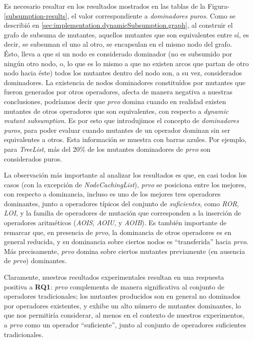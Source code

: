 Es necesario resaltar en los resultados mostrados en las tablas de la Figura-\ref{subsumption-results}, el valor correspondiente a \emph{dominadores puros}. Como se describi\'o en \ref{sec:implementation.dynamicSubsumption.graph}, al construir el grafo de subsuma de mutantes, aquellos mutantes que son equivalentes entre s\'i, es decir, se subsuman el uno al otro, se encapsulan en el mismo nodo del grafo. \'Esto, lleva a que si un nodo es considerado dominador (no es subsumido por ning\'un otro nodo, o, lo que es lo mismo a que no existen arcos que partan de otro nodo hacia \'este) todos los mutantes dentro del nodo son, a su vez, considerados dominadores. La existencia de nodos dominadores constitu\'idos por mutantes que fueron generados por otros operadores, afecta de manera negativa a nuestras conclusiones, podr\'iamos decir que \emph{prvo} domina cuando en realidad existen mutantes de otros operadores que son equivalentes, con respecto a \emph{dynamic mutant subsumption}. Es por esto que introdujimos el concepto de \emph{dominadores puros}, para poder evaluar cuando mutantes de un operador dominan sin ser equivalentes a otros. Esta informaci\'on se muestra con barras azules. Por ejemplo, para \emph{TreeList}, m\'as del 20\% de los mutantes dominadores de \emph{prvo} son considerados puros.

La observaci\'on m\'as importante al analizar los resultados es que, en casi todos los casos (con la excepci\'on de \emph{NodeCachingList}), \emph{prvo} se posiciona entre los mejores, con respecto a dominancia, incluso es uno de los mejores tres operadores dominantes, junto a operadores t\'ipicos del conjunto de \emph{suficientes}, como \emph{ROR}, \emph{LOI}, y la familia de operadores de mutaci\'on que corresponden a la inserci\'on de operadores aritm\'eticos (\emph{AOIS}, \emph{AOIU}, y \emph{AOIB}). Es tambi\'en importante de remarcar que, en presencia de \emph{prvo}, la dominancia de otros operadores es en general reducida, y su dominancia sobre ciertos nodos es ``transferida'' hacia \emph{prvo}. M\'as precisamente, \emph{prvo} domina sobre ciertos mutantes previamente (en ausencia de \emph{prvo}) dominantes.

Claramente, nuestros resultados experimentales resultan en una respuesta positiva a \textbf{RQ1}: \emph{prvo} complementa de manera significativa al conjunto de operadores tradicionales; los mutantes producidos son en general no dominados por operadores existentes, y exhibe un alto n\'umero de mutantes dominantes, lo que nos permitir\'ia considerar, al menos en el contexto de nuestros experimentos, a \emph{prvo} como un operador ``suficiente'', junto al conjunto de operadores suficientes tradicionales.

